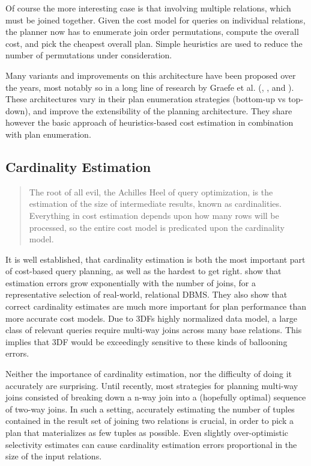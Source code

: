 \documentclass[../index.tex]{subfiles}
\begin{document}
Of course the more interesting case is that involving multiple
relations, which must be joined together. Given the cost model for
queries on individual relations, the planner now has to enumerate join
order permutations, compute the overall cost, and pick the cheapest
overall plan. Simple heuristics are used to reduce the number of
permutations under consideration.

Many variants and improvements on this architecture have been proposed
over the years, most notably so in a long line of research by Graefe
et al. (\cite{graefe1987exodus}, \cite{graefe1993volcano}, and
\cite{graefe1995cascades}). These architectures vary in their plan
enumeration strategies (bottom-up vs top-down), and improve the
extensibility of the planning architecture. They share however the
basic approach of heuristics-based cost estimation in combination with
plan enumeration.

\subsection{Cardinality Estimation}

\begin{quote}
The root of all evil, the Achilles Heel of query optimization, is the
estimation of the size of intermediate results, known as
cardinalities. Everything in cost estimation depends upon how many
rows will be processed, so the entire cost model is predicated upon
the cardinality model.

\cite{lohman2014query}
\end{quote}

It is well established, that cardinality estimation is both the most
important part of cost-based query planning, as well as the hardest to
get right. \cite{leis2015good} show that estimation errors grow
exponentially with the number of joins, for a representative selection
of real-world, relational DBMS. They also show that correct
cardinality estimates are much more important for plan performance
than more accurate cost models. Due to 3DFs highly normalized data
model, a large class of relevant queries require multi-way joins
across many base relations. This implies that 3DF would be exceedingly
sensitive to these kinds of ballooning errors.

Neither the importance of cardinality estimation, nor the difficulty
of doing it accurately are surprising. Until recently, most strategies
for planning multi-way joins consisted of breaking down a n-way join
into a (hopefully optimal) sequence of two-way joins. In such a
setting, accurately estimating the number of tuples contained in the
result set of joining two relations is crucial, in order to pick a
plan that materializes as few tuples as possible. Even slightly
over-optimistic selectivity estimates can cause cardinality estimation
errors proportional in the size of the input relations.
\end{document}
